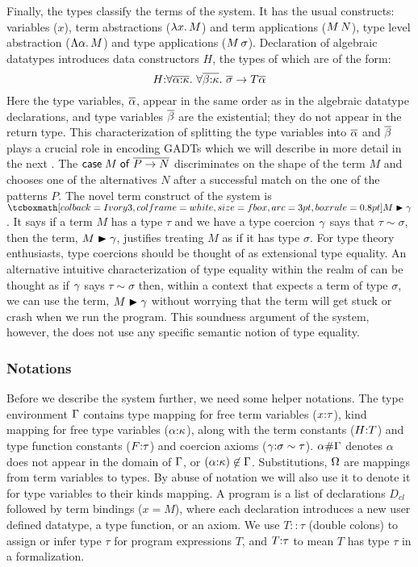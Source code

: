 \documentclass[manuscript,screen,nonacm]{acmart}
\begin{document}
Finally, the types classify the terms of the system. It has the usual constructs: variables ($x$), term abstractions ($\lambda x.\, M$) and term applications ($M \, N$), type level abstraction ($\Lambda \alpha.\, M$) and type applications ($M\,\sigma$). Declaration of algebraic datatypes introduces data constructors $H$, the types of which are of the form:
$$
H {:} \forall\overline{\alpha{:}\kappa}.~\forall\overline{\beta{:}\kappa}.~\overline{\sigma} \to T \overline{\alpha}
$$
Here the type variables, $\overline{\alpha}$, appear in the same order as in the algebraic datatype declarations, and type variables $\overline{\beta}$ are the existential; they do not appear in the return type. This characterization of splitting the type variables into $\overline{\alpha}$ and $\overline{\beta}$ plays a crucial role in encoding GADTs which we will describe in more detail in the next . The $\mathsf{case}\;M\;\mathsf{of}\;\overline{P \to N}$ discriminates on the shape of the term $M$ and chooses one of the alternatives $N$ after a successful match on the one of the patterns $P$. The novel term construct of the system is $\shl{\Cast {M} \Co}$. It says if a term $M$ has a type $\tau$ and we have a type coercion $\gamma$ says that $\tau\sim\sigma$, then the term, $M\mathrel{\blacktriangleright}\gamma$, justifies treating $M$ as if it has type $\sigma$. For type theory enthusiasts, type coercions should be thought of as extensional type equality. An alternative intuitive characterization of type equality within the realm of \SFC can be thought as if $\gamma$ says $\tau \sim \sigma$ then, within a context that expects a term of type $\sigma$, we can use the term, $M\mathrel{\blacktriangleright}\gamma$ without worrying that the term will get stuck or crash when we run the program.  This soundness argument of the system, however, the does not use any specific semantic notion of type equality.%

\subsubsection{Notations}
Before we describe the system further, we need some helper notations. The type environment $\Gamma$ contains type mapping for free term variables ($x{:}\tau$), kind mapping for free type variables ($\alpha{:}\kappa$), along with the term constants ($H{:} T$) and type function constants ($F{:} \tau$) and coercion axioms ($\gamma{:}\sigma\sim\tau$). $\alpha\#\Gamma$ denotes $\alpha$ does not appear in the domain of $\Gamma$, or $(\alpha{:}\kappa) \not\in \Gamma$. Substitutions, $\Omega$ are mappings from term variables to types. By abuse of notation we will also use it to denote it for type variables to their kinds mapping. A program is a list of declarations $D_{cl}$ followed by term bindings ($x = M$), where each declaration introduces a new user defined datatype, a type function, or an axiom. We use $T :: \tau$ (double colons) to assign or infer type $\tau$ for program expressions $T$, and $T {:} \tau$ to mean $T$ has type $\tau$ in a formalization.
\end{document}

